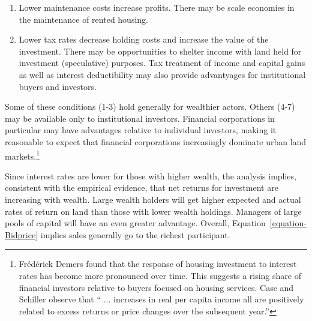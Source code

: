 \begin{enumerate}
\item Lower maintenance costs increase profits. There may be scale economies in the maintenance  of rented housing. 

\item Lower tax rates decrease holding costs and increase the value of the investment. There may be opportunities to shelter income with land held for investment (speculative) purposes. Tax treatment of income and capital gains as well as interest deductibility may also provide advantyages for institutional buyers and investors.%
\end{enumerate}

Some  of these conditions (1-3) hold generally for wealthier actors. Others (4-7) may be available only to institutional investors.  Financial corporations in particular may have advantages relative to individual investors, making it  reasonable to expect that financial corporations increasingly dominate urban land 
markets.\footnote{Fr\'ed\'erick Demers \cite{demersModellingForecastingHousing2005} found that the response of housing investment to interest rates has become more pronounced over time. This suggests a rising share of financial investors relative to buyers focused on housing services. Case and Schiller \cite{caseThereBubbleHousing2003} observe that `` ... increases in real per capita income all are positively related to excess returns or price changes over the subsequent year.''}  

Since interest rates are lower for those with higher wealth, the analysis implies, consistent with the empirical evidence, that net returns for investment are increasing with wealth. Large wealth holders will get higher expected and actual rates of return on land than those with lower wealth holdings. Managers of large pools of capital will have an even greater   advantage. Overall, Equation~\ref{equation-Bidprice} implies  sales generally go to the richest participant.
 




